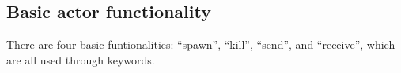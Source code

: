 \subsection{Basic actor functionality}

There are four basic funtionalities: \enquote{spawn}, \enquote{kill}, \enquote{send}, and \enquote{receive}, which are all used through keywords. 



